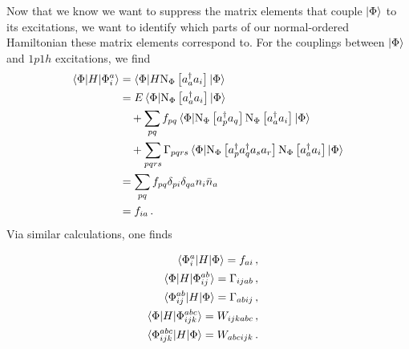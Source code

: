 Now that we know we want to suppress the matrix elements
that couple $\ket{\Phi}$ to its excitations,
we want to identify which parts of our normal-ordered Hamiltonian
these matrix elements correspond to.
For the couplings between $\ket{\Phi}$ and $1p1h$ excitations, we find
\begin{align}
  \phantom{\braket{\Phi | H |\Phi_{i}^{a}}}
   & \begin{aligned}
    \mathllap{\braket{\Phi | H |\Phi_{i}^{a}}} & = \braket{\Phi | H \noref{\crea{a} \annih{i}}| \Phi}
  \end{aligned} \\
   & \begin{aligned}
    \mathllap{} & = E \braket{\Phi | \noref{\crea{a} \annih{i}} | \Phi}                                               \\
                & \quad + \sum_{pq} f_{pq} \braket{\Phi |\noref{\crea{p}\annih{q}} \noref{\crea{a} \annih{i}} | \Phi} \\
                & \quad + \sum_{pqrs} \Gamma_{pqrs}
    \braket{\Phi |\noref{\crea{p} \crea{q} \annih{s} \annih{r}}\noref{\crea{a} \annih{i}} | \Phi}
  \end{aligned} \\
   & \begin{aligned}
    \mathllap{} & = \sum_{pq} f_{pq} \delta_{pi} \delta_{qa} n_{i} \bar{n}_{a}
  \end{aligned} \\
   & \begin{aligned}
    \mathllap{} & = f_{ia}\,.
  \end{aligned}
\end{align}
Via similar calculations, one finds
\begin{samepage}
  \begin{subequations}
    \begin{align}
      \begin{split}
        \braket{\Phi_{i}^{a} | H | \Phi} &= f_{ai}\,,
      \end{split} \\
      \begin{split}
        \braket{\Phi | H | \Phi_{ij}^{ab}} &= \Gamma_{ijab}\,,
      \end{split} \\
      \begin{split}
        \braket{\Phi_{ij}^{ab} | H | \Phi} &= \Gamma_{abij}\,,
      \end{split} \\
      \begin{split}
        \braket{\Phi | H | \Phi_{ijk}^{abc}} &= W_{ijkabc}\,,
      \end{split} \\
      \begin{split}
        \braket{\Phi_{ijk}^{abc} | H | \Phi} &= W_{abcijk}\,.
      \end{split}
    \end{align}
  \end{subequations}
\end{samepage}
